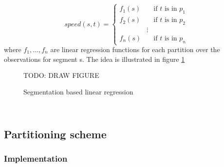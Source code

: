 \[ speed(s,t) =
  \begin{cases}
    f_1(s)       & \quad \text{if } t \text{ is in } p_1\\
    f_2(s)  & \quad \text{if } t \text{ is in } p_2\\
    &\vdots\\
    f_n(s) & \quad \text{if } t \text{ is in } p_n
  \end{cases}
\]
where $f_1,...,f_n$ are linear regression functions for each partition over the observations for segment s. The idea is illustrated in figure \ref{fig:segmented-regression}
\begin{figure}\label{fig:segmented-regression}
\centering
TODO: DRAW FIGURE
\caption{Segmentation based linear regression}
\end{figure}
% 
\\
\subsection{Partitioning scheme}\label{patterns:segmentation}

\subsubsection{Implementation}\label{patterns:weka}

